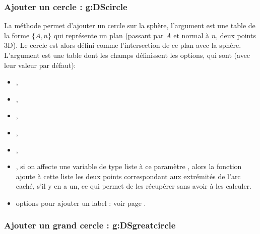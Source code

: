 \subsubsection{Ajouter un cercle : g:DScircle}
\def\writeoptions{L'argument \argu{options} est une table dont les champs définissent les options, qui sont (avec leur valeur par défaut)}%

La méthode  permet d'ajouter un cercle sur la sphère, l'argument  est une table de la forme $\{A,n\}$ qui représente un plan (passant par $A$ et normal à $n$, deux points 3D). Le cercle est alors défini comme l'intersection de ce plan avec la sphère. \writeoptions :
    \begin{itemize}
        \item {}, 
        \item {},
        \item {},
        \item {},
        \item {},
        \item {}, si on affecte une variable de type liste à ce paramètre , alors la fonction ajoute à cette liste les deux points correspondant aux extrémités de l'arc caché, s'il y en a un, ce qui permet de les récupérer sans avoir à les calculer.
        \item options pour ajouter un label : voir page \pageref{addlabel}.
    \end{itemize}
    
\subsubsection{Ajouter un grand cercle : g:DSgreatcircle}

